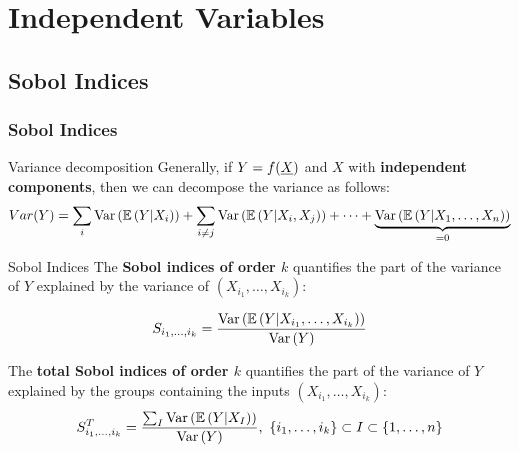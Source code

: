 \documentclass[8pt]{beamer}
\begin{document}
\section{Independent Variables }



\subsection{Sobol Indices}


\begin{frame}
\frametitle{Sobol Indices}
\small

\begin{block}{Variance decomposition}
Generally, if $Y=f({\underline{X}})$ and $X$ with {\bf independent components}, then we can decompose the variance as follows: 
\begin{equation}
\label{decompVar}
Var(Y) = \sum_i \mbox{Var}\left( \mathbb{E}\left( Y|X_i \right) \right) + \sum_{i \neq j} \mbox{Var}\left( \mathbb{E}\left( Y|X_i,X_j \right) \right) + \dots + \underbrace{\mbox{Var}\left( \mathbb{E}\left( Y|X_1,\dots, X_n \right) \right)}_{=0}
\end{equation}
\end{block}


\begin{block}{Sobol Indices}
The \alert{\bf Sobol indices of order $k$} quantifies the part of the variance of $Y$ explained by the variance of $(X_{i_1},\dots, X_{i_k})$:

\begin{equation}
\label{SobolOrdrek}
\displaystyle S_{i_1, \dots, i_k} =\frac{\mbox{Var}\left( \mathbb{E}\left( Y|X_{i_1}, \dots, X_{i_k} \right) \right)}{\mbox{Var}\left( Y \right)}
\end{equation}

The \alert{\bf total Sobol indices of order $k$} quantifies the part of the variance of $Y$ explained by the groups containing the inputs $(X_{i_1},\dots, X_{i_k})$:
\begin{equation}
\label{SobolTotalOrdrek}
\displaystyle S^T_{i_1, \dots, i_k} =\frac{\sum_I\mbox{Var}\left( \mathbb{E}\left( Y|X_{I} \right) \right)}{\mbox{Var}\left( Y \right)},\, \, \{i_1, \dots, i_k\} \subset I\subset \{1, \dots, n \}
\end{equation}

\end{block}
\end{frame}
\end{document}
